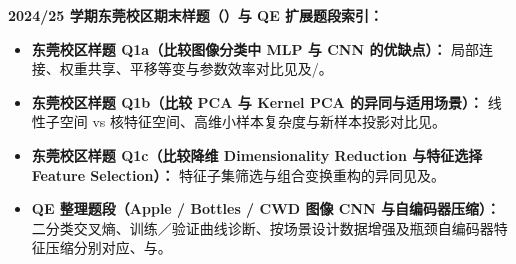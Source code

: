 \textbf{2024/25 学期东莞校区期末样题（）与 QE 扩展题段索引：}
\begin{itemize}
\item \textbf{东莞校区样题 Q1a（比较图像分类中 MLP 与 CNN 的优缺点）：} 局部连接、权重共享、平移等变与参数效率对比见及/。
\item \textbf{东莞校区样题 Q1b（比较 PCA 与 Kernel PCA 的异同与适用场景）：} 线性子空间 vs 核特征空间、高维小样本复杂度与新样本投影对比见。
\item \textbf{东莞校区样题 Q1c（比较降维 Dimensionality Reduction 与特征选择 Feature Selection）：} 特征子集筛选与组合变换重构的异同见及。
\item \textbf{QE 整理题段（Apple / Bottles / CWD 图像 CNN 与自编码器压缩）：} 二分类交叉熵、训练／验证曲线诊断、按场景设计数据增强及瓶颈自编码器特征压缩分别对应、与。
\end{itemize}
